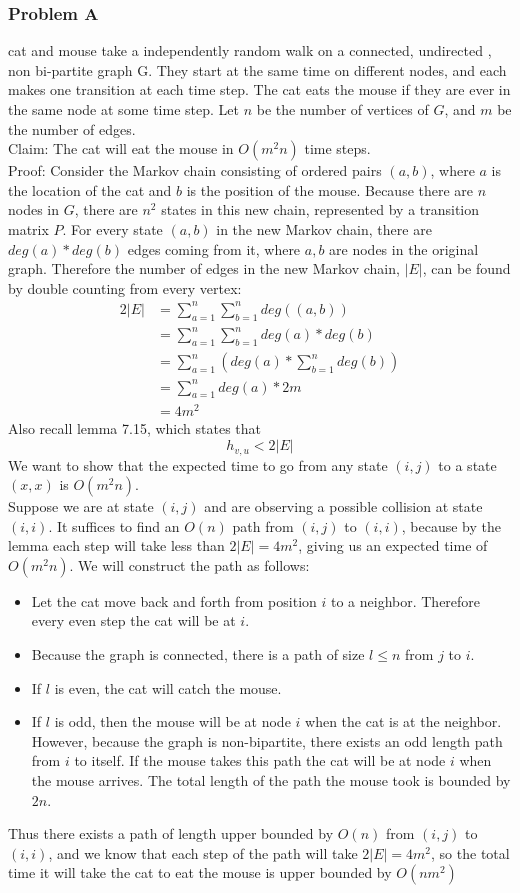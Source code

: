 \documentclass[12pt,letterpaper]{article}
\newenvironment{answer}[1]{
  \subsubsection*{Problem #1}
}{\newpage}
\begin{document}
\begin{answer}{7.22}
A cat and mouse take a independently random walk on a connected, undirected , non bi-partite graph G. They start at the same time on different nodes, and each makes one transition at each time step. The cat eats the mouse if they are ever in the same node at some time step. Let $n$ be the number of vertices of $G$, and $m$ be the number of edges.\\
Claim: The cat will eat the mouse in $O(m^2 n)$ time steps.\\
Proof: Consider the Markov chain consisting of ordered pairs $(a,b)$, where $a$ is the location of the cat and $b$ is the position of the mouse. Because there are $n$ nodes in $G$, there are $n^2$ states in this new chain, represented by a transition matrix $P$. For every state $(a,b)$ in the new Markov chain, there are $deg(a)*deg(b)$ edges coming from it, where $a,b$ are nodes in the original graph. Therefore the number of edges in the new Markov chain, $|E|$, can be found by double counting from every vertex:
	\begin{align*}
	 2|E| &= \sum_{a=1}^n \sum_{b=1}^n deg((a,b)) \\
	 	&= \sum_{a=1}^n \sum_{b=1}^n deg(a)*deg(b)\\
	 	&= \sum_{a=1}^n \left( deg(a) * \sum_{b=1}^n deg(b) \right)\\
	 	&= \sum_{a=1}^n deg(a) * 2m \\
	 	&= 4m^2
	\end{align*}
Also recall lemma 7.15, which states that
	$$ h_{v,u} < 2|E| $$
We want to show that the expected time to go from any state $(i,j)$ to a state $(x,x)$ is $O(m^2 n)$. \\
Suppose we are at state $(i,j)$ and are observing a possible collision at state $(i,i)$. It suffices to find an $O(n)$ path from $(i,j)$ to $(i,i)$, because by the lemma each step will take less than $2 |E| = 4m^2$, giving us an expected time of $O(m^2 n)$. We will construct the path as follows:
	\begin{itemize}
		\item Let the cat move back and forth from position $i$ to a neighbor. Therefore every even step the cat will be at $i$.
		\item Because the graph is connected, there is a path of size $l \le n$ from $j$ to $i$.
		\item If $l$ is even, the cat will catch the mouse.
		\item If $l$ is odd, then the mouse will be at node $i$ when the cat is at the neighbor. However, because the graph is non-bipartite, there exists an odd length path from $i$ to itself. If the mouse takes this path the cat will be at node $i$ when the mouse arrives. The total length of the path the mouse took is bounded by $2n$.
	\end{itemize}
	Thus there exists a path of length upper bounded by $O(n)$ from $(i,j)$ to $(i,i)$, and we know that each step of the path will take $2|E| = 4m^2$, so the total time it will take the cat to eat the mouse is upper bounded by $O(n m^2)$
\end{answer}
\end{document}
